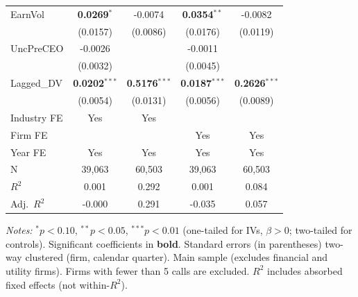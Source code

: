 \begin{landscape}
\begin{table}[H]
\begin{tabular}{lcccc}
EarnVol & \textbf{0.0269}$^{*}$ & -0.0074 & \textbf{0.0354}$^{**}$ & -0.0082 \\
 & (0.0157) & (0.0086) & (0.0176) & (0.0119) \\
UncPreCEO & -0.0026 &  & -0.0011 &  \\
 & (0.0032) &  & (0.0045) &  \\
Lagged\_DV & \textbf{0.0202}$^{***}$ & \textbf{0.5176}$^{***}$ & \textbf{0.0187}$^{***}$ & \textbf{0.2626}$^{***}$ \\
 & (0.0054) & (0.0131) & (0.0056) & (0.0089) \\
\midrule
Industry FE & Yes & Yes &  &  \\
Firm FE &  &  & Yes & Yes \\
Year FE & Yes & Yes & Yes & Yes \\
\midrule
N & 39,063 & 60,503 & 39,063 & 60,503 \\
$R^2$ & 0.001 & 0.292 & 0.001 & 0.084 \\
Adj.~$R^2$ & -0.000 & 0.291 & -0.035 & 0.057 \\
\bottomrule
\end{tabular}
\begin{minipage}{\linewidth}
\vspace{2pt}\scriptsize
\textit{Notes:} $^{*}p<0.10$, $^{**}p<0.05$, $^{***}p<0.01$ (one-tailed for IVs, $\beta > 0$; two-tailed for controls).
 Significant coefficients in \textbf{bold}.
 Standard errors (in parentheses) two-way clustered (firm, calendar quarter).
 Main sample (excludes financial and utility firms). Firms with fewer than 5 calls are excluded.
 $R^2$ includes absorbed fixed effects (not within-$R^2$).
\end{minipage}
\end{table}
\end{landscape}